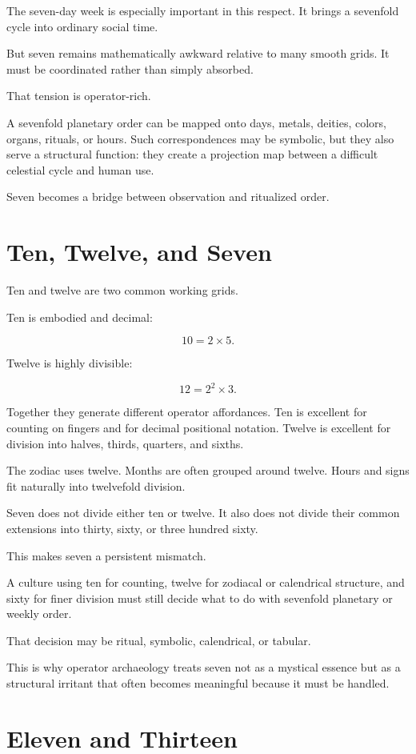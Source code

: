 \documentclass[11pt]{book}
\begin{document}
The seven-day week is especially important in this respect. It brings a sevenfold cycle into ordinary social time.

But seven remains mathematically awkward relative to many smooth grids. It must be coordinated rather than simply absorbed.

That tension is operator-rich.

A sevenfold planetary order can be mapped onto days, metals, deities, colors, organs, rituals, or hours. Such correspondences may be symbolic, but they also serve a structural function: they create a projection map between a difficult celestial cycle and human use.

Seven becomes a bridge between observation and ritualized order.

\section{Ten, Twelve, and Seven}

Ten and twelve are two common working grids.

Ten is embodied and decimal:

\[
10 = 2 \times 5.
\]

Twelve is highly divisible:

\[
12 = 2^2 \times 3.
\]

Together they generate different operator affordances. Ten is excellent for counting on fingers and for decimal positional notation. Twelve is excellent for division into halves, thirds, quarters, and sixths.

The zodiac uses twelve. Months are often grouped around twelve. Hours and signs fit naturally into twelvefold division.

Seven does not divide either ten or twelve. It also does not divide their common extensions into thirty, sixty, or three hundred sixty.

This makes seven a persistent mismatch.

A culture using ten for counting, twelve for zodiacal or calendrical structure, and sixty for finer division must still decide what to do with sevenfold planetary or weekly order.

That decision may be ritual, symbolic, calendrical, or tabular.

This is why operator archaeology treats seven not as a mystical essence but as a structural irritant that often becomes meaningful because it must be handled.

\section{Eleven and Thirteen}
\end{document}
